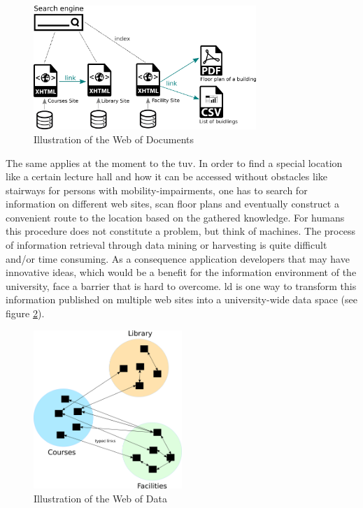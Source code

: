 \documentclass[draft,final]{vutinfth} %
\begin{document}
\begin{figure}[h]
    \centering    
    \includegraphics[width=0.75\textwidth]{graphics/webOfDocuments.png}
    \caption{Illustration of the Web of Documents}
    \label{fig:motiviation-web-of-documents}
\end{figure}

The same applies at the moment to the \gls{tuv}. In order to find a special location like a certain lecture hall and how it can be accessed without obstacles like stairways for persons with mobility-impairments, one has to search for information on different web sites, scan floor plans and eventually construct a convenient route to the location based on the gathered knowledge. For humans this procedure does not constitute a problem, but think of machines. The process of information retrieval through data mining or harvesting is quite difficult and/or time consuming. As a consequence application developers that may have innovative ideas, which would be a benefit for the information environment of the university, face a barrier that is hard to overcome. \gls{ld} is one way to transform this information published on multiple web sites into a university-wide data space (see figure \ref{fig:motiviation-web-of-data}).

\begin{figure}[h]
    \centering    
    \includegraphics[width=0.5\textwidth]{graphics/webOfData.png}
    \caption{Illustration of the Web of Data}
    \label{fig:motiviation-web-of-data}
\end{figure}
\end{document}
